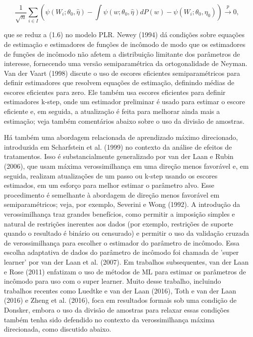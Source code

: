\documentclass[a4paper,12pt]{article}[abntex2]
\begin{document}
\[
\frac{1}{\sqrt{n}} \sum_{i \in I} \left( \psi(W_i; \theta_0, \hat{\eta}) - \int \psi(w; \theta_0, \hat{\eta})dP(w) - \psi(W_i; \theta_0, \eta_0) \right) \xrightarrow{p} 0,
\]

que se reduz a (1.6) no modelo PLR. Newey (1994) dá condições sobre equações de estimação e estimadores de funções de incômodo de modo que os estimadores de funções de incômodo não afetem a distribuição limitante dos parâmetros de interesse, fornecendo uma versão semiparamétrica da ortogonalidade de Neyman. Van der Vaart (1998) discute o uso de escores eficientes semiparamétricos para definir estimadores que resolvem equações de estimação, definindo médias de escores eficientes para zero. Ele também usa escores eficientes para definir estimadores k-step, onde um estimador preliminar é usado para estimar o escore eficiente e, em seguida, a atualização é feita para melhorar ainda mais a estimação; veja também comentários abaixo sobre o uso da divisão de amostras.

Há também uma abordagem relacionada de aprendizado máximo direcionado, introduzida em Scharfstein et al. (1999) no contexto da análise de efeitos de tratamentos. Isso é substancialmente generalizado por van der Laan e Rubin (2006), que usam máxima verossimilhança em uma direção menos favorável e, em seguida, realizam atualizações de um passo ou k-step usando os escores estimados, em um esforço para melhor estimar o parâmetro alvo. Esse procedimento é semelhante à abordagem de direção menos favorável em semiparamétricos; veja, por exemplo, Severini e Wong (1992). A introdução da verossimilhança traz grandes benefícios, como permitir a imposição simples e natural de restrições inerentes aos dados (por exemplo, restrições de suporte quando o resultado é binário ou censurado) e permitir o uso da validação cruzada de verossimilhança para escolher o estimador do parâmetro de incômodo. Essa escolha adaptativa de dados do parâmetro de incômodo foi chamada de 'super learner' por van der Laan et al. (2007). Em trabalhos subsequentes, van der Laan e Rose (2011) enfatizam o uso de métodos de ML para estimar os parâmetros de incômodo para uso com o super learner. Muito desse trabalho, incluindo trabalhos recentes como Luedtke e van der Laan (2016), Toth e van der Laan (2016) e Zheng et al. (2016), foca em resultados formais sob uma condição de Donsker, embora o uso da divisão de amostras para relaxar essas condições também tenha sido defendido no contexto da verossimilhança máxima direcionada, como discutido abaixo.
\end{document}
